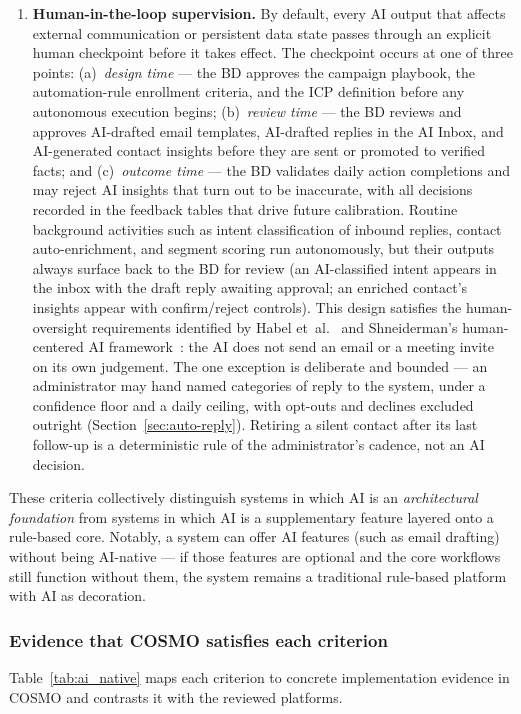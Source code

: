 \documentclass[a4paper]{article}
\begin{document}
\begin{enumerate}
  \item  \textbf{Human-in-the-loop supervision.}
    By default, every AI output that affects external communication or
    persistent data state passes through an explicit human
    checkpoint before it takes effect. The checkpoint occurs at
    one of three points: (a)~\emph{design time} --- the BD
    approves the campaign playbook, the automation-rule
    enrollment criteria, and the ICP definition before any
    autonomous execution begins; (b)~\emph{review time} --- the
    BD reviews and approves AI-drafted email templates, AI-drafted
    replies in the AI Inbox, and AI-generated contact insights
    before they are sent or promoted to verified facts; and
    (c)~\emph{outcome time} --- the BD validates daily action
    completions and may reject AI insights that turn out to be
    inaccurate, with all decisions recorded in the feedback tables
    that drive future calibration. Routine background activities
    such as intent classification of inbound replies, contact
    auto-enrichment, and segment scoring run autonomously, but
    their outputs always surface back to the BD for review (an
    AI-classified intent appears in the inbox with the draft reply
    awaiting approval; an enriched contact's insights appear with
    confirm/reject controls). This design satisfies the
    human-oversight requirements identified by Habel
    et~al.~\cite{habel2025aln} and Shneiderman's human-centered AI
    framework~\cite{shneiderman2020hci}: the AI does not send an email
    or a meeting invite on its own judgement. The one exception is
    deliberate and bounded --- an administrator may hand named
    categories of reply to the system, under a confidence floor and a
    daily ceiling, with opt-outs and declines excluded outright
    (Section~\ref{sec:auto-reply}). Retiring a silent contact after its
    last follow-up is a deterministic rule of the administrator's
    cadence, not an AI decision.
\end{enumerate}

These criteria collectively distinguish systems in which AI is an
\emph{architectural foundation} from systems in which AI is a
supplementary feature layered onto a rule-based core. Notably, a
system can offer AI features (such as email drafting) without
being AI-native --- if those features are optional and the core
workflows still function without them, the system remains a
traditional rule-based platform with AI as decoration.


\subsubsection{Evidence that COSMO satisfies each criterion} 
Table~\ref{tab:ai_native} maps each criterion to concrete 
implementation evidence in COSMO and contrasts it with the 
reviewed platforms.
\end{document}
